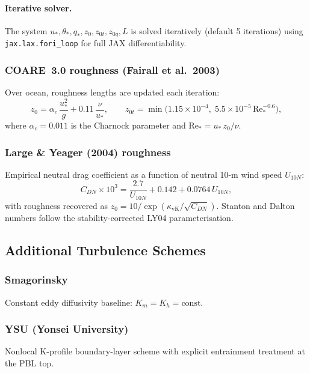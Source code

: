 \documentclass[11pt,a4paper]{article}
\begin{document}
\paragraph{Iterative solver.}
The system $u_*,\theta_*,q_*,z_0,z_{0t},z_{0q},L$ is solved iteratively (default 5 iterations) using \texttt{jax.lax.fori\_loop} for full JAX differentiability.

\subsubsection{COARE~3.0 roughness (Fairall et al.\ 2003)}

Over ocean, roughness lengths are updated each iteration:
\begin{equation}
  z_0 = \alpha_c\,\frac{u_*^2}{g}+0.11\,\frac{\nu}{u_*}, \qquad
  z_{0t} = \min\!\bigl(1.15\times10^{-4},\;5.5\times10^{-5}\,\mathrm{Re}_*^{-0.6}\bigr),
\end{equation}
where $\alpha_c=0.011$ is the Charnock parameter and $\mathrm{Re}_*=u_*\,z_0/\nu$.

\subsubsection{Large \& Yeager (2004) roughness}

Empirical neutral drag coefficient as a function of neutral 10-m wind speed $U_{10N}$:
\begin{equation}
  C_{DN}\times10^3 = \frac{2.7}{U_{10N}}+0.142+0.0764\,U_{10N},
\end{equation}
with roughness recovered as $z_0=10/\exp(\kappa_{\mathrm{vK}}/\sqrt{C_{DN}})$.  Stanton and Dalton numbers follow the stability-corrected LY04 parameterisation.

\subsection{Additional Turbulence Schemes}

\subsubsection{Smagorinsky}
Constant eddy diffusivity baseline: $K_m=K_h=\text{const}$.

\subsubsection{YSU (Yonsei University)}
Nonlocal K-profile boundary-layer scheme with explicit entrainment treatment at the PBL top.
\end{document}

